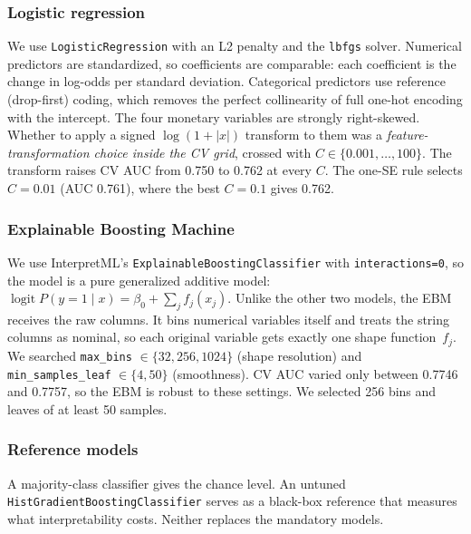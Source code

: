 \documentclass[a4paper,11pt]{article}
\begin{document}
\subsubsection{Logistic regression}
We use \texttt{LogisticRegression} with an L2 penalty and the \texttt{lbfgs} solver. Numerical predictors are standardized, so coefficients are comparable: each coefficient is the change in log-odds per standard deviation. Categorical predictors use reference (drop-first) coding, which removes the perfect collinearity of full one-hot encoding with the intercept. The four monetary variables are strongly right-skewed. Whether to apply a signed $\log(1+|x|)$ transform to them was a \emph{feature-transformation choice inside the CV grid}, crossed with $C\in\{0.001,\dots,100\}$. The transform raises CV AUC from 0.750 to 0.762 at every $C$. The one-SE rule selects $C=0.01$ (AUC 0.761), where the best $C=0.1$ gives 0.762.

\subsubsection{Explainable Boosting Machine}
We use InterpretML's \texttt{ExplainableBoostingClassifier} with \texttt{interactions=0}, so the model is a pure generalized additive model: $\operatorname{logit} P(y=1\mid x)=\beta_0+\sum_j f_j(x_j)$. Unlike the other two models, the EBM receives the raw columns. It bins numerical variables itself and treats the string columns as nominal, so each original variable gets exactly one shape function~$f_j$. We searched \texttt{max\_bins} $\in\{32,256,1024\}$ (shape resolution) and \texttt{min\_samples\_leaf} $\in\{4,50\}$ (smoothness). CV AUC varied only between 0.7746 and 0.7757, so the EBM is robust to these settings. We selected 256 bins and leaves of at least 50 samples.

\subsubsection{Reference models}
A majority-class classifier gives the chance level. An untuned \texttt{HistGradient\allowbreak BoostingClassifier} serves as a black-box reference that measures what interpretability costs. Neither replaces the mandatory models.
\end{document}
